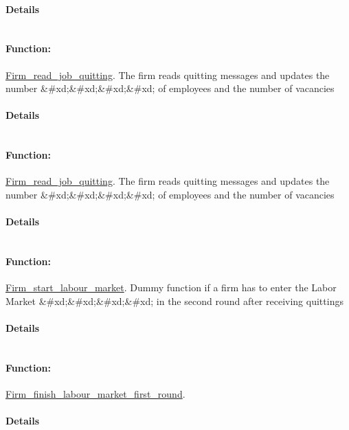 \documentclass[a4paper,11pt]{article}
\begin{document}
\paragraph{Details}
\begin{verbatim}
\end{verbatim}
\paragraph{Function:}\url{Firm_read_job_quitting}.
The firm reads quitting messages and updates the number \&\#xd;\&\#xd;\&\#xd;\&\#xd;
of employees and the number of vacancies
\paragraph{Details}
\begin{verbatim}
\end{verbatim}
\paragraph{Function:}\url{Firm_read_job_quitting}.
The firm reads quitting messages and updates the number \&\#xd;\&\#xd;\&\#xd;\&\#xd;
of employees and the number of vacancies
\paragraph{Details}
\begin{verbatim}
\end{verbatim}
\paragraph{Function:}\url{Firm_start_labour_market}.
Dummy function if a firm has to enter the Labor Market \&\#xd;\&\#xd;\&\#xd;\&\#xd;
in the second round after receiving quittings
\paragraph{Details}
\begin{verbatim}
\end{verbatim}
\paragraph{Function:}\url{Firm_finish_labour_market_first_round}.

\paragraph{Details}
\begin{verbatim}
\end{verbatim}
\end{document}
